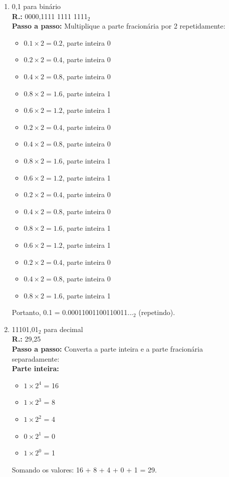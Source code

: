 \documentclass{article}[12pt]
\begin{document}
\begin{enumerate}
\begin{enumerate}
            \item 0,1 para binário \\
            \textbf{R.:} 0000,1111 1111 1111$_2$ \\
            \textbf{Passo a passo:} Multiplique a parte fracionária por 2 repetidamente:
            \begin{itemize}
                \item $0.1 \times 2 = 0.2$, parte inteira 0
                \item $0.2 \times 2 = 0.4$, parte inteira 0
                \item $0.4 \times 2 = 0.8$, parte inteira 0
                \item $0.8 \times 2 = 1.6$, parte inteira 1
                \item $0.6 \times 2 = 1.2$, parte inteira 1
                \item $0.2 \times 2 = 0.4$, parte inteira 0
                \item $0.4 \times 2 = 0.8$, parte inteira 0
                \item $0.8 \times 2 = 1.6$, parte inteira 1
                \item $0.6 \times 2 = 1.2$, parte inteira 1
                \item $0.2 \times 2 = 0.4$, parte inteira 0
                \item $0.4 \times 2 = 0.8$, parte inteira 0
                \item $0.8 \times 2 = 1.6$, parte inteira 1
                \item $0.6 \times 2 = 1.2$, parte inteira 1
                \item $0.2 \times 2 = 0.4$, parte inteira 0
                \item $0.4 \times 2 = 0.8$, parte inteira 0
                \item $0.8 \times 2 = 1.6$, parte inteira 1
            \end{itemize}
            Portanto, 0.1 = 0.00011001100110011...$_2$ (repetindo).

            \item 11101,01$_2$ para decimal \\
            \textbf{R.:} 29,25 \\
            \textbf{Passo a passo:} Converta a parte inteira e a parte fracionária separadamente: \\
                \textbf{Parte inteira:}
                \begin{itemize}
                    \item $1 \times 2^4$ = 16
                    \item $1 \times 2^3$ = \phantom{0}8
                    \item $1 \times 2^2$ = \phantom{0}4
                    \item $0 \times 2^1$ = \phantom{0}0
                    \item $1 \times 2^0$ = \phantom{0}1
                \end{itemize}
                Somando os valores: 16 + 8 + 4 + 0 + 1 = 29.


\end{enumerate}
\end{enumerate}
\end{document}
